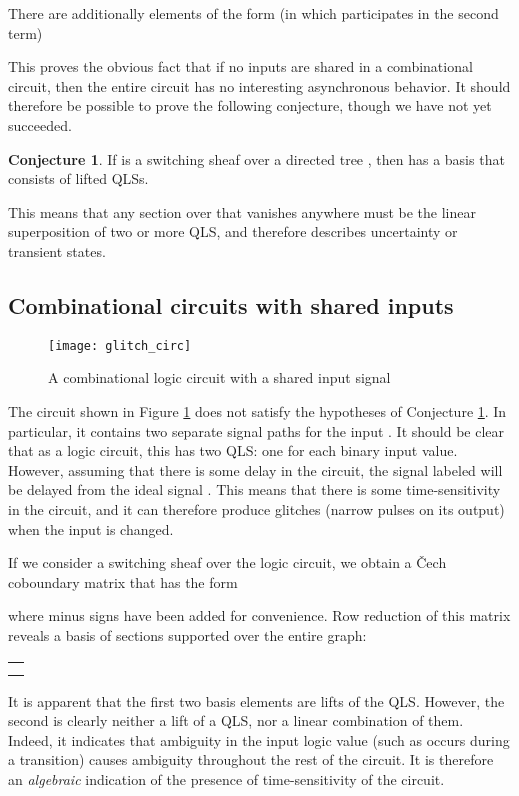 \documentclass{amsart}
\theoremstyle{plain}
\theoremstyle{definition}
\newtheorem{conj}[thm]{Conjecture}
\begin{document}
There are additionally  elements of the form (in which
 participates in the second term)


This proves the obvious fact that if no inputs are shared in a
combinational circuit, then the entire circuit has no interesting
asynchronous behavior.  It should therefore be possible to prove the
following conjecture, though we have not yet succeeded.

\begin{conj}
\label{dag_conj}
If  is a switching sheaf over a directed tree ,
then  has a basis that consists of lifted QLSs.
\end{conj}

This means that any section over  that vanishes anywhere must be
the linear superposition of two or more QLS, and therefore describes
uncertainty or transient states.  

\subsection{Combinational circuits with shared inputs}

\begin{figure}
\begin{center}
\texttt{[image: glitch\_circ]}
\caption{A combinational logic circuit with a shared input signal}
\label{glitch_circ_fig}
\end{center}
\end{figure}

The circuit shown in Figure \ref{glitch_circ_fig} does not satisfy the
hypotheses of Conjecture \ref{dag_conj}.  In particular, it contains
two separate signal paths for the input .  It should be clear that
as a logic circuit, this has two QLS: one for each binary input value.
However, assuming that there is some delay in the circuit, the signal
labeled  will be delayed from the ideal signal .
This means that there is some time-sensitivity in the circuit, and it
can therefore produce glitches (narrow pulses on its output) when the
input is changed.

If we consider a switching sheaf over the logic circuit, we obtain a
\v{C}ech coboundary matrix that has the form

where minus signs have been added for convenience.  Row reduction of
this matrix reveals a basis of sections supported over the entire
graph:
\begin{center}
\begin{tabular}{c}
\\
\\
\\
\end{tabular}
\end{center}
It is apparent that the first two basis elements are lifts of the
QLS.  However, the second is clearly neither a lift of a QLS, nor a
linear combination of them.  Indeed, it indicates that ambiguity in
the input logic value (such as occurs during a transition) causes
ambiguity throughout the rest of the circuit.  It is therefore an {\it
  algebraic} indication of the presence of time-sensitivity of the
circuit. 
\end{document}
